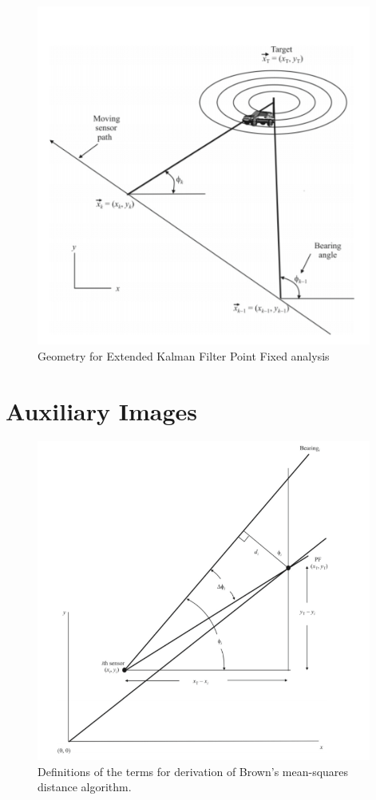 \documentclass[english,purist]{ist-report}
\begin{document}
\begin{figure}[!h]
\centering
\includegraphics[width=110mm]{target13.png}
\caption{Geometry for Extended Kalman Filter Point Fixed analysis}
\label{target13}
\end{figure} 




\appendix
\pagebreak
\section{Auxiliary Images}

\begin{figure}[!h]
\centering
\includegraphics[width=110mm]{target10.png}
\caption{Definitions of the terms for derivation of Brown’s mean-squares distance algorithm.}
\label{target10}
\end{figure} 
\end{document}

